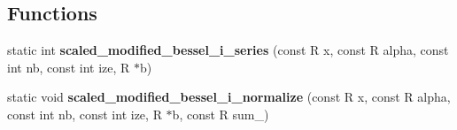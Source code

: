 \subsection*{Functions}
\begin{DoxyCompactItemize}
\item 
\hypertarget{group__applications__fastsumS2__test_ga54cdbbc74ffb567a185b5dcbc06a8f72}{static int {\bfseries scaled\-\_\-modified\-\_\-bessel\-\_\-i\-\_\-series} (const R x, const R alpha, const int nb, const int ize, R $\ast$b)}\label{group__applications__fastsumS2__test_ga54cdbbc74ffb567a185b5dcbc06a8f72}

\item 
\hypertarget{group__applications__fastsumS2__test_gaaa64831aa16e7dc4ceadbb42efd30621}{static void {\bfseries scaled\-\_\-modified\-\_\-bessel\-\_\-i\-\_\-normalize} (const R x, const R alpha, const int nb, const int ize, R $\ast$b, const R sum\-\_\-)}\label{group__applications__fastsumS2__test_gaaa64831aa16e7dc4ceadbb42efd30621}


\end{DoxyCompactItemize}
